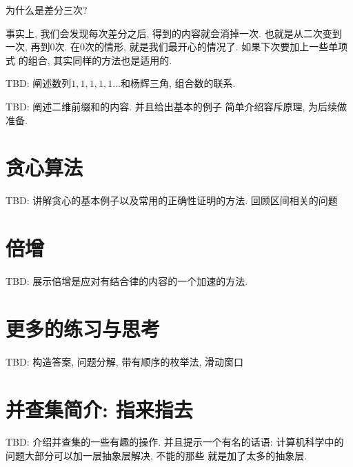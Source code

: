 \begin{ques}
    为什么是差分三次?
\end{ques}

事实上, 我们会发现每次差分之后, 得到的内容就会消掉一次. 也就是从二次变到
一次, 再到0次. 在0次的情形, 就是我们最开心的情况了. 如果下次要加上一些单项式
的组合, 其实同样的方法也是适用的. 

 TBD: 阐述数列$1,1,1,1,1...$和杨辉三角, 组合数的联系.

 TBD: 阐述二维前缀和的内容. 并且给出基本的例子
简单介绍容斥原理, 为后续做准备. 

\section{贪心算法}

TBD: 讲解贪心的基本例子以及常用的正确性证明的方法. 回顾区间相关的问题

\section{倍增}

TBD: 展示倍增是应对有结合律的内容的一个加速的方法.

\section{更多的练习与思考}

TBD: 构造答案, 问题分解, 带有顺序的枚举法, 滑动窗口

\section{并查集简介: 指来指去}

TBD: 介绍并查集的一些有趣的操作. 并且提示一个有名的话语: 
计算机科学中的问题大部分可以加一层抽象层解决, 不能的那些
就是加了太多的抽象层. 